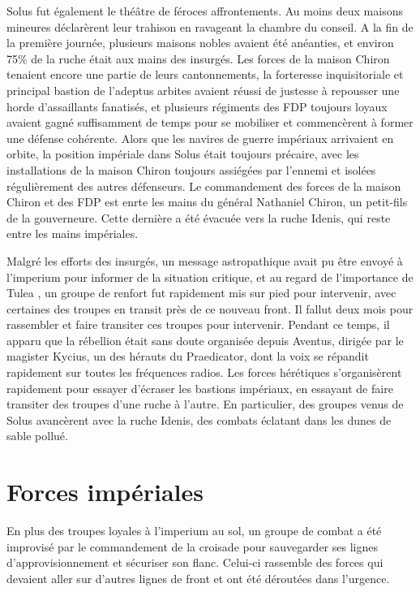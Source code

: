 \documentclass[10pt,a4paper]{book}
\newcommand{\zone}{Tulea }
\begin{document}
Solus fut également le théâtre de féroces affrontements. Au moins deux maisons mineures déclarèrent leur trahison en ravageant la chambre du conseil. A la fin de la première journée, plusieurs maisons nobles avaient été anéanties, et environ 75\% de la ruche était aux mains des insurgés. Les forces de la maison Chiron tenaient encore une partie de leurs cantonnements, la forteresse inquisitoriale et principal bastion de l'adeptus arbites avaient réussi de justesse à repousser une horde d'assaillants fanatisés, et plusieurs régiments des FDP toujours loyaux avaient gagné suffisamment de temps pour se mobiliser et commencèrent à former une défense cohérente. Alors que les navires de guerre impériaux arrivaient en orbite, la position impériale dans Solus était toujours précaire, avec les installations de la maison Chiron toujours assiégées par l'ennemi et isolées régulièrement des autres défenseurs. Le commandement des forces de la maison Chiron et des FDP est enrte les mains du général Nathaniel Chiron, un petit-fils de la gouverneure. Cette dernière a été évacuée vers la ruche Idenis, qui reste entre les mains impériales.



Malgré les efforts des insurgés, un message astropathique avait pu être envoyé à l'imperium pour informer de la situation critique, et au regard de l'importance de \zone , un groupe de renfort fut rapidement mis sur pied pour intervenir, avec certaines des troupes en transit près de ce nouveau front. Il fallut deux mois pour rassembler et faire transiter ces troupes pour intervenir. 
Pendant ce temps, il apparu que la rébellion était sans doute organisée depuis Aventus, dirigée par le magister Kycius, un des hérauts du Praedicator, dont la voix se répandit rapidement sur toutes les fréquences radios. Les forces hérétiques s'organisèrent rapidement pour essayer d'écraser les bastions impériaux, en essayant de faire transiter des troupes d'une ruche à l'autre. En particulier, des groupes venus de Solus avancèrent avec la ruche Idenis, des combats éclatant dans les dunes de sable pollué.
\chapter{Forces impériales}
En plus des troupes loyales à l'imperium au sol, un groupe de combat a été improvisé par le commandement de la croisade pour sauvegarder ses lignes d'approvisionnement et sécuriser son flanc. Celui-ci rassemble des forces qui devaient aller sur d'autres lignes de front et ont été déroutées dans l'urgence.
\end{document}
